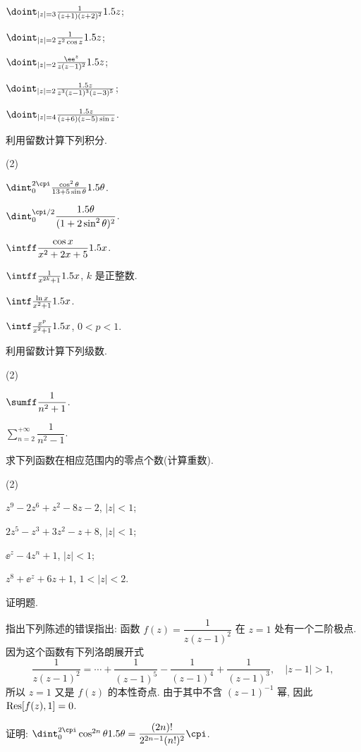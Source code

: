 \begin{homework}
\begin{subex}
\begin{subsubex}
        \item $\doint_{|z|=3}\frac{1}{(z+1)(z+2)^2}\d z$;
        \item $\doint_{|z|=2}\frac1{z^2\cos z}\d z$;
        \item $\doint_{|z|=2}\frac{\ee^z}{z(z-1)^2}\d z$;
        \item $\doint_{|z|=2}\frac{\d z}{z^3(z-1)^3(z-3)^5}$;
        \item $\doint_{|z|=4}\frac{\d z}{(z+6)(z-5)\sin z}$.
      \end{subsubex}
      \item 利用留数计算下列积分.
        \begin{subsubex}(2)
          \item $\dint_0^{2\cpi}\frac{\cos^2\theta}{13+5\sin\theta}\d \theta$.
          \item $\dint_0^{\cpi/2}\dfrac{\d \theta}{(1+2\sin^2\theta)^2}$.
          \item $\intff \dfrac{\cos x}{x^2+2x+5}\d x$.
          \item $\intff \frac{1}{x^{2k}+1}\d x$, $k$ 是正整数.
          \item $\intf\frac{\ln x}{x^2+1}\d x$.
          \item $\intf\frac{x^p}{x^2+1}\d x$, $0<p<1$.
        \end{subsubex}
      \item 利用留数计算下列级数.
        \begin{subsubex}(2)
          \item $\sumff \dfrac1{n^2+1}$.
          \item $\displaystyle\sum_{n=2}^{+\infty} \dfrac1{n^2-1}$.
        \end{subsubex}
      \item 求下列函数在相应范围内的零点个数(计算重数).
        \begin{subsubex}(2)
          \item $z^9-2z^6+z^2-8z-2$, $|z|<1$;
          \item $2z^5-z^3+3z^2-z+8$, $|z|<1$;
          \item $\ee^z-4z^n+1$, $|z|<1$;
          \item $z^8+\ee^z+6z+1$, $1<|z|<2$.
        \end{subsubex}
  \end{subex}
  \item 证明题.
  \begin{subex}
    \item 指出下列陈述的错误指出: 函数 $f(z)=\dfrac1{z(z-1)^2}$ 在 $z=1$ 处有一个二阶极点. 因为这个函数有下列洛朗展开式
      \[
        \frac1{z(z-1)^2}=\cdots+\frac1{(z-1)^5}-\frac1{(z-1)^4}+\frac1{(z-1)^3},\quad|z-1|>1,
      \]
      所以 $z=1$ 又是 $f(z)$ 的本性奇点. 由于其中不含 $(z-1)^{-1}$ 幂, 因此 ${\mathrm{Res}}[f(z),1]=0$.
    \item 证明: $\dint_0^{2\cpi}\cos^{2n}\theta\d \theta=\dfrac{(2n)!}{2^{2n-1}(n!)^2}\cpi$.
  \end{subex}
\end{homework}
